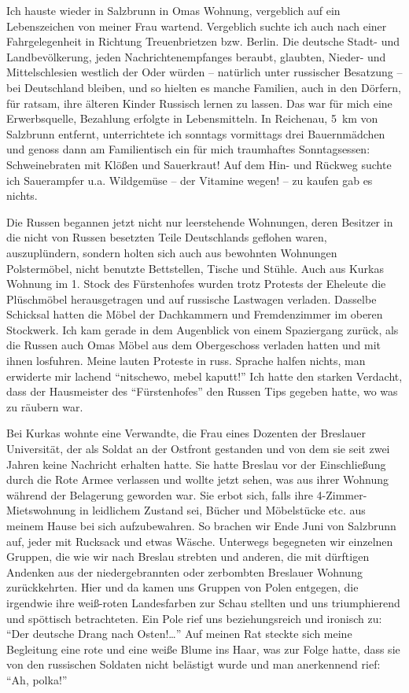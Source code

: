 Ich hauste wieder in Salzbrunn in Omas Wohnung, vergeblich auf ein Lebenszeichen von meiner Frau wartend. Vergeblich suchte ich auch nach einer Fahrgelegenheit in Richtung Treuenbrietzen bzw. Berlin. Die deutsche Stadt- und Landbevölkerung, jeden Nachrichtenempfanges beraubt,  glaubten, Nieder- und Mittelschlesien westlich der Oder würden -- natürlich unter russischer Besatzung -- bei Deutschland bleiben, und so hielten es manche Familien, auch in den Dörfern, für ratsam, ihre älteren Kinder Russisch lernen zu lassen. Das war für mich eine Erwerbsquelle, Bezahlung erfolgte in Lebensmitteln. In Reichenau, 5~km von Salzbrunn entfernt, unterrichtete ich sonntags vormittags drei Bauernmädchen und genoss dann am Familientisch ein für mich traumhaftes Sonntagsessen: Schweinebraten mit Klößen und Sauerkraut! Auf dem Hin- und Rückweg suchte ich Sauerampfer u.a. Wildgemüse -- der Vitamine wegen! -- zu kaufen gab es nichts.

Die Russen begannen jetzt nicht nur leerstehende Wohnungen, deren Besitzer in die nicht von Russen besetzten Teile Deutschlands geflohen waren, auszuplündern, sondern holten sich auch aus bewohnten Wohnungen Polstermöbel, nicht benutzte Bettstellen, Tische und Stühle. Auch aus Kurkas Wohnung im 1. Stock des Fürstenhofes wurden trotz Protests der Eheleute die Plüschmöbel herausgetragen und auf russische Lastwagen verladen. Dasselbe Schicksal hatten die Möbel der Dachkammern und Fremdenzimmer im oberen Stockwerk. Ich kam gerade in dem Augenblick von einem Spaziergang  zurück, als die Russen auch Omas Möbel aus dem Obergeschoss verladen hatten und mit ihnen losfuhren. Meine lauten Proteste in russ. Sprache halfen nichts, man erwiderte mir lachend \enquote{nitschewo, mebel kaputt!} Ich hatte den starken Verdacht, dass der Hausmeister des \enquote{Fürstenhofes} den Russen Tips gegeben hatte, wo was zu räubern war.

Bei Kurkas wohnte eine Verwandte, die Frau eines Dozenten der Breslauer Universität, der als Soldat an der Ostfront gestanden und von dem sie seit zwei Jahren keine Nachricht erhalten hatte. Sie hatte Breslau vor der Einschließung durch die Rote Armee verlassen und wollte jetzt sehen, was aus ihrer Wohnung während der Belagerung geworden war. Sie erbot sich, falls ihre 4-Zimmer-Mietswohnung in leidlichem Zustand sei, Bücher und Möbelstücke etc. aus meinem Hause bei sich aufzubewahren. So brachen wir Ende Juni von Salzbrunn auf, jeder mit Rucksack und etwas Wäsche. Unterwegs begegneten wir einzelnen Gruppen, die wie wir nach Breslau strebten und anderen, die mit dürftigen Andenken aus der niedergebrannten oder zerbombten Breslauer Wohnung zurückkehrten. Hier und da  kamen uns Gruppen von Polen entgegen, die irgendwie ihre weiß-roten Landesfarben zur Schau stellten und uns triumphierend und spöttisch betrachteten. Ein Pole rief uns beziehungsreich und ironisch zu: \enquote{Der deutsche Drang nach Osten!\dots} Auf meinen Rat steckte sich meine Begleitung eine rote und eine weiße Blume ins Haar, was zur Folge hatte, dass sie von den russischen Soldaten nicht belästigt wurde und man anerkennend rief: \enquote{Ah, polka!}

